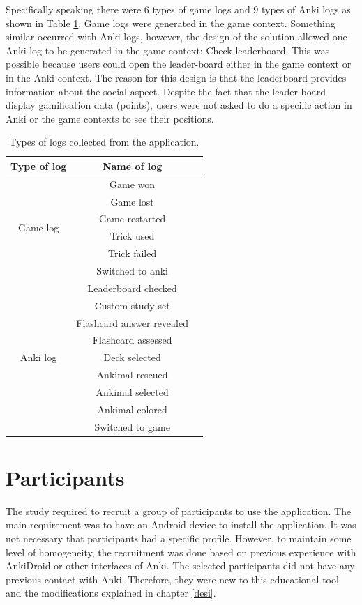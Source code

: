 Specifically speaking there were 6 types of game logs and 9 types of Anki logs as shown in Table \ref{tab:log-types}. Game logs were generated in the game context. Something similar occurred with Anki logs, however, the design of the solution allowed one Anki log to be generated in the game context: Check leaderboard. This was possible because users could open the leader-board either in the game context or in the Anki context. The reason for this design is that the leaderboard provides information about the social aspect. Despite the fact that the leader-board display gamification data (points), users were not asked to do a specific action in Anki or the game contexts to see their positions.

\begin{table}[!htb]
    \centering
    {\renewcommand{\arraystretch}{2}
        \begin{tabular}{ |c|c|c| }
            \hline
            \textbf{Type of log} & \textbf{Name of log} \\
            \hline
            \multirow{6}{3cm}{Game log} &  Game won\\
            & Game lost \\
            & Game restarted \\
            & Trick used \\
            & Trick failed \\
            & Switched to anki \\
            \hline
            \multirow{9}{3cm}{Anki log} &  Leaderboard checked\\
            & Custom study set \\
            & Flashcard answer revealed\\
            & Flashcard assessed \\
            & Deck selected \\
            & Ankimal rescued\\
            & Ankimal selected\\
            & Ankimal colored\\
            & Switched to game \\
            \hline
        \end{tabular}
    }
    \caption{Types of logs collected from the application.}
    \label{tab:log-types}
\end{table}

\section{Participants}
\label{participants}
The study required to recruit a group of participants to use the application. The main requirement was to have an Android device to install the application. It was not necessary that participants had a specific profile. However, to maintain some level of homogeneity, the recruitment was done based on previous experience with AnkiDroid or other interfaces of Anki. The selected participants did not have any previous contact with Anki. Therefore, they were new to this educational tool and the modifications explained in chapter \ref{desi}.

